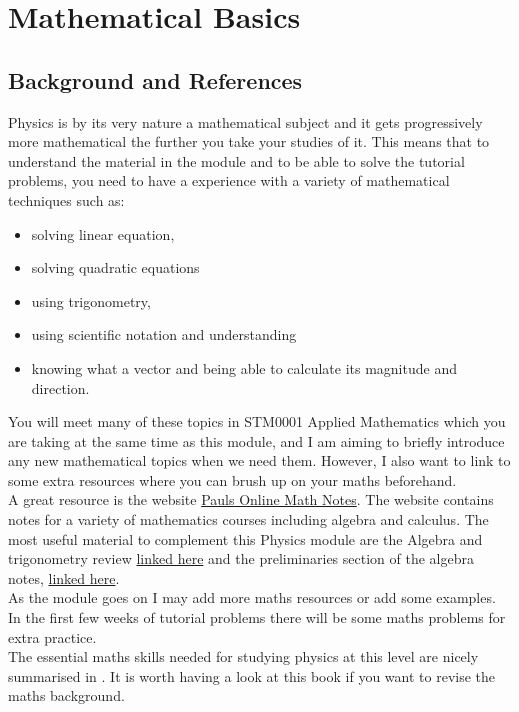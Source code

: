 
\chapter{Mathematical Basics}
\section{Background and References}
Physics is by its very nature a mathematical subject and it gets progressively more mathematical the further you take your studies of it. This means that to understand the material in the module and to be able to solve the tutorial problems, you need to have a experience with a variety of mathematical techniques such as:
\begin{itemize}
\setlength{\itemsep}{-5pt}
    \item solving linear equation,
    \item solving quadratic equations
    \item using trigonometry,
    \item using scientific notation and understanding 
    \item knowing what a vector and being able to calculate its magnitude and direction.
\end{itemize}

You will meet many of these topics in STM0001 Applied Mathematics which you are taking at the same time as this module, and I am aiming to briefly introduce any new mathematical topics when we need them. However, I also want to link to some extra resources where you can brush up on your maths beforehand.\\


A great resource is the website \href{https://tutorial.math.lamar.edu/}{Pauls Online Math Notes}. The website contains notes for a variety of mathematics courses including algebra and calculus. The most useful material to complement this Physics module are the Algebra and trigonometry review \href{https://tutorial.math.lamar.edu/Extras/AlgebraTrigReview/AlgebraTrigIntro.aspx}{linked here} and the preliminaries section of the algebra notes, \href{https://tutorial.math.lamar.edu/Classes/Alg/Preliminaries.aspx}{linked here}.\\

As the module goes on I may add more maths resources or add some examples. In the first few weeks of tutorial problems there will be some maths problems for extra practice.\\

The essential maths skills needed for studying physics at this level are nicely summarised in \citep{garrett2015essential}. It is worth having a look at this book if you want to revise the maths background.

